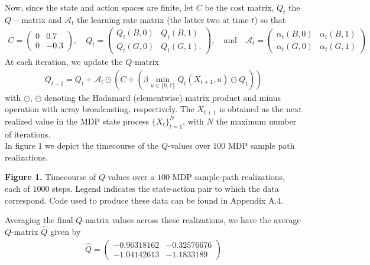 \documentclass[10pt]{article}
\newcommand{\bp}[1]{\left({#1}\right)}
\newcommand{\1}[1]{\mathbbm{1}_{#1}}
\newcommand{\mc}[1]{\mathcal{#1}}
\begin{document}
    Now, since the state and action spaces are finite, let $C$ be the cost matrix, $Q_t$ the $Q-$matrix and $\mc{A}_t$ the learning rate matrix (the latter two at time $t$) so that
    \begin{align*}
        C=\begin{pmatrix}
            0 & 0.7\\
            0 & -0.3
        \end{pmatrix},\quad Q_t=\begin{pmatrix}
            Q_t(B, 0) & Q_t(B, 1)\\
            Q_t(G, 0) & Q_t(G, 1).
        \end{pmatrix},\quad\text{and}\quad\mc{A}_t=\begin{pmatrix}
            \alpha_t(B, 0) & \alpha_t(B, 1)\\
            \alpha_t(G, 0) & \alpha_t(G, 1)
        \end{pmatrix}
    \end{align*}
    At each iteration, we update the $Q$-matrix
    \begin{align*}
        Q_{t+1}=Q_t + \mc{A}_t\odot\bp{C+\bp{\beta\min_{u\in\{0,1\}}Q_t(X_{t+1},u)\ominus Q_t}}
    \end{align*}
    with $\odot$, $\ominus$ denoting the Hadamard (elementwise) matrix product and minus operation with array broadcasting, respectively. The $X_{t+1}$ is obtained as the next realized value in the MDP state process $\{X_t\}_{t=1}^N$, with $N$ the maximum number of iterations.\\[5pt]
    In figure 1 we depict the timecourse of the $Q$-values over $100$ MDP sample path realizations.
    \begin{center}
    \end{center}
    \begin{center}
        \begin{minipage}{\dimexpr\paperwidth-5cm}
           {\bf Figure 1.} Timecourse of $Q$-values over a $100$ MDP sample-path realizations, each of $1000$ steps. Legend indicates the state-action pair to which the data correspond.
           Code used to produce these data can be found in Appendix A.4.
        \end{minipage}
    \end{center}
    Averaging the final $Q$-matrix values across these realizations, we have the average $Q$-matrix $\hat{Q}$ given by
    \begin{align*}
        \hat{Q}=\begin{pmatrix}
            -0.96318162 & -0.32576676\\
            -1.04142613 & -1.1833189
        \end{pmatrix}
    \end{align*}
\end{document}
